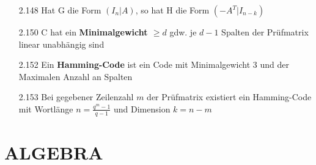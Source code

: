 \documentclass{scrartcl}
\begin{document}
\begin{itemize}
    \item [2.148] Hat G die Form $(I_n | A)$, so hat H die Form $(-A^T | I_{n-k})$

    \item [2.150] C hat ein \textbf{Minimalgewicht $\geq d$} gdw. je $d-1$ Spalten der Prüfmatrix linear unabhängig sind

    \item [2.152] Ein \textbf{Hamming-Code} ist ein Code mit Minimalgewicht 3 und der Maximalen Anzahl an Spalten

    \item [2.153] Bei gegebener Zeilenzahl $m$ der Prüfmatrix existiert ein Hamming-Code mit Wortlänge $n = \frac{q^m - 1}{q-1}$ und Dimension $k = n - m$
\end{itemize}
    

\section*{ALGEBRA}
\end{document}
